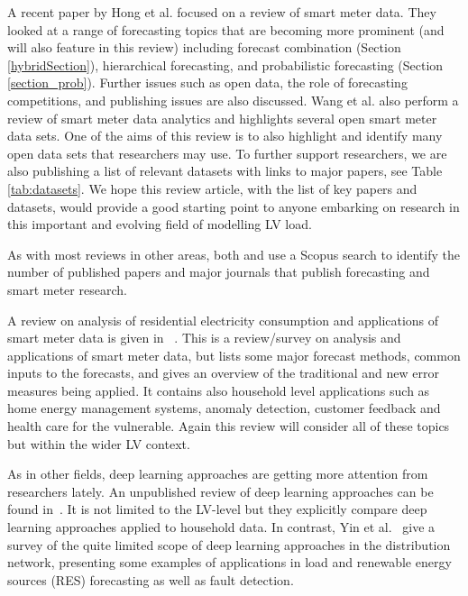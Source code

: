 A recent paper by Hong et al. \cite{Tao2020efa} focused on a review of smart meter data. They looked at a range of forecasting topics that are becoming more prominent (and will also feature in this review) including forecast combination (Section \ref{hybridSection}), hierarchical forecasting, and probabilistic forecasting (Section \ref{section_prob}). Further issues such as open data, the role of forecasting competitions, and publishing issues are also discussed. Wang et al. \cite{Wang2018ros} also perform a review of smart meter data analytics and highlights several open smart meter data sets. One of the aims of this review is to also highlight and identify many open data sets that researchers may use. To further support researchers, we are also publishing a list of relevant datasets with links to major papers, see Table \ref{tab:datasets}. We hope this review article, with the list of key papers and datasets, would provide a good starting point to anyone embarking on research in this important and evolving field of modelling LV load.

As with most reviews in other areas, both \cite{Tao2020efa} and \cite{Wang2018ros} use a Scopus search to identify the number of published papers and major journals that publish forecasting and smart meter research. 

A review on analysis of residential electricity consumption and applications of smart meter data is given in ~\cite{Yildiz2017rai}. This is a review/survey on analysis and applications of smart meter data, but lists some major forecast methods, common inputs to the forecasts, and gives an overview of the traditional and new error measures being applied. It contains also household level applications such as home energy management systems, anomaly detection, customer feedback and health care for the vulnerable. Again this review will consider all of these topics but within the wider LV context. 

As in other fields, deep learning approaches are getting more attention from researchers lately. An unpublished review of deep learning approaches can be found in~\cite{gasparin2019deep}. It is not limited to the LV-level but they explicitly compare deep learning approaches applied to household data.  In contrast, Yin et al.~\cite{yin2020aso} give a survey of the quite limited scope of deep learning approaches in the distribution network, presenting some examples of applications in load and renewable energy sources (RES) forecasting as well as fault detection.  

